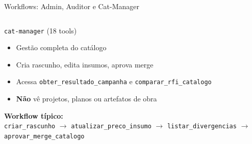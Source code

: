 \documentclass[aspectratio=169,10pt]{beamer}
\newcommand{\role}[1]{\texttt{\small #1}}
\begin{document}
\begin{frame}{Workflows: Admin, Auditor e Cat-Manager}
\begin{columns}[T]
    \begin{block}{\role{cat-manager} (18 tools)}
      \begin{itemize}\scriptsize
        \item Gestão completa do catálogo
        \item Cria rascunho, edita insumos, aprova merge
        \item Acessa \texttt{obter\_resultado\_campanha} e \texttt{comparar\_rfi\_catalogo}
        \item \textbf{Não} vê projetos, planos ou artefatos de obra
      \end{itemize}
      \vspace{4pt}
      \textbf{Workflow típico:}\\
      {\scriptsize \texttt{criar\_rascunho} $\to$ \texttt{atualizar\_preco\_insumo}  $\to$ \texttt{listar\_divergencias} $\to$ \texttt{aprovar\_merge\_catalogo}}
    \end{block}
  \end{columns}
\end{frame}
\end{document}
